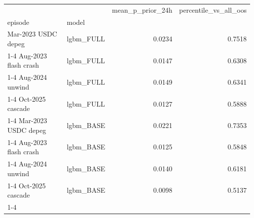 \begin{tabular}{llrr}
\toprule
 &  & mean_p_prior_24h & percentile_vs_all_oos \\
episode & model &  &  \\
\midrule
Mar-2023 USDC depeg & lgbm_FULL & 0.0234 & 0.7518 \\
\cline{1-4}
Aug-2023 flash crash & lgbm_FULL & 0.0147 & 0.6308 \\
\cline{1-4}
Aug-2024 unwind & lgbm_FULL & 0.0149 & 0.6341 \\
\cline{1-4}
Oct-2025 cascade & lgbm_FULL & 0.0127 & 0.5888 \\
\cline{1-4}
Mar-2023 USDC depeg & lgbm_BASE & 0.0221 & 0.7353 \\
\cline{1-4}
Aug-2023 flash crash & lgbm_BASE & 0.0125 & 0.5848 \\
\cline{1-4}
Aug-2024 unwind & lgbm_BASE & 0.0140 & 0.6181 \\
\cline{1-4}
Oct-2025 cascade & lgbm_BASE & 0.0098 & 0.5137 \\
\cline{1-4}
\bottomrule
\end{tabular}
